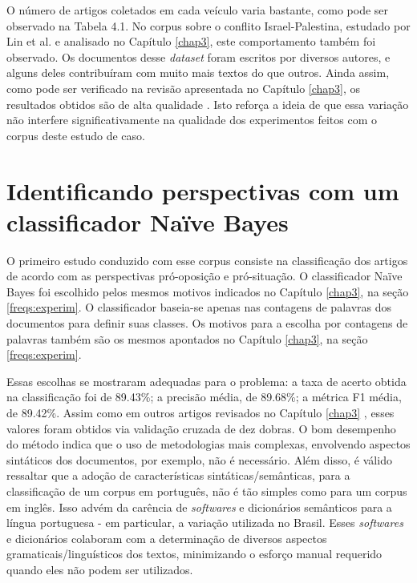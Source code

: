 O número de artigos coletados em cada veículo varia bastante, como pode ser observado na Tabela 4.1. No corpus sobre o conflito Israel-Palestina, estudado por Lin et al. e analisado no Capítulo \ref{chap3}, este comportamento também foi observado. Os documentos desse \emph{dataset} foram escritos por diversos autores, e alguns deles contribuíram com muito mais textos do que outros. Ainda assim, como pode ser verificado na revisão apresentada no Capítulo \ref{chap3}, os resultados obtidos são de alta qualidade \cite{lin-et-al2006}. Isto reforça a ideia de que essa variação não interfere significativamente na qualidade dos experimentos feitos com o corpus deste estudo de caso.


\section{Identificando perspectivas com um classificador Naïve Bayes}
\label{estudo:sec2}

O primeiro estudo conduzido com esse corpus consiste na classificação dos artigos de acordo com as perspectivas pró-oposição e pró-situação. O classificador Naïve Bayes foi escolhido pelos mesmos motivos indicados no Capítulo \ref{chap3}, na seção \ref{freqs:experim}. O classificador baseia-se apenas nas contagens de palavras dos documentos para definir suas classes. Os motivos para a escolha por contagens de palavras também são os mesmos apontados no Capítulo \ref{chap3}, na seção \ref{freqs:experim}. 

Essas escolhas se mostraram adequadas para o problema: a taxa de acerto obtida na classificação foi de 89.43\%; a precisão média, de  89.68\%; a métrica F1 média, de 89.42\%. Assim como em outros artigos revisados no Capítulo \ref{chap3} \cite{lin-et-al2006} \cite{aaai-politics} \cite{klebanov}, esses valores foram obtidos via validação cruzada de dez dobras. %
 O bom desempenho do método indica que o uso de metodologias mais complexas, envolvendo aspectos sintáticos dos documentos, por exemplo, não é necessário. Além disso, é válido ressaltar que a adoção de características sintáticas/semânticas, para a classificação de um corpus em português, não é tão simples como para um corpus em inglês. Isso advém  da carência de \emph{softwares} e dicionários semânticos para a língua portuguesa - em particular, a variação utilizada no Brasil. Esses \emph{softwares} e dicionários colaboram com a determinação de diversos aspectos gramaticais/linguísticos dos textos, minimizando o esforço manual requerido quando eles não podem ser utilizados.


